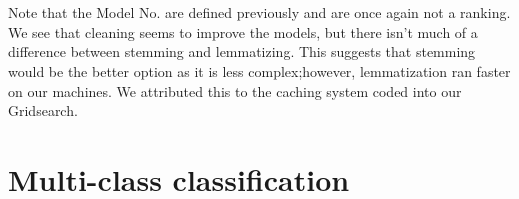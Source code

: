 \documentclass[11pt]{article}
\begin{document}
\begin{multicols}{2}
 \\\\
Note that the Model No. are defined previously and are once again not a ranking. We see that cleaning seems to improve the models, but there isn't much of a difference between stemming and lemmatizing. This suggests that stemming would be the better option as it is less complex;however, lemmatization ran faster on our machines. We attributed this to the caching system coded into our Gridsearch.
\section*{Multi-class classification}

\end{multicols}
\end{document}

